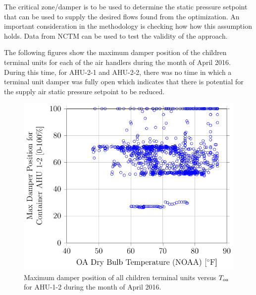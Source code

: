 The critical zone/damper is to be used to determine the static pressure setpoint that can be used to supply the desired flows found from the optimization. An important consideration in the methodology is checking how how this assumption holds. Data from NCTM can be used to test the validity of the approach.

The following figures show the maximum damper position of the children terminal units for each of the air handlers during the month of April 2016. During this time, for AHU-2-1 and AHU-2-2, there was no time in which a terminal unit damper was fully open which indicates that there is potential for the supply air static pressure setpoint to be reduced.  

\newcommand{\MaxDampCaption}[1]{Maximum damper position of all children terminal units versus \(\oat{}\) for #1 during the month of April 2016.}

\begin{figure}
\centering
\includegraphics{Plots/MaximumDamperPosition-1-2.pdf} 
\caption{\MaxDampCaption{AHU-1-2}}
\label{fig:MaxDamperPositionforContainerAHU12vsOADryBulbTemperatureNOAA}
\end{figure}

